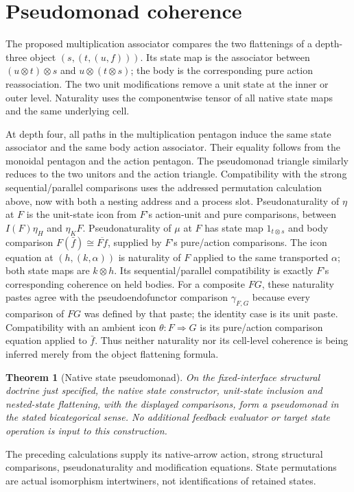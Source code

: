 \documentclass{article}
\newtheorem{theorem}{Theorem}
\begin{document}
\section{Pseudomonad coherence}
The proposed multiplication associator compares the two flattenings of a depth-three object $(s,(t,(u,f)))$. Its state map is the associator between $(u\otimes t)\otimes s$ and $u\otimes(t\otimes s)$; the body is the corresponding pure action reassociation. The two unit modifications remove a unit state at the inner or outer level. Naturality uses the componentwise tensor of all native state maps and the same underlying cell.

At depth four, all paths in the multiplication pentagon induce the same state associator and the same body action associator. Their equality follows from the monoidal pentagon and the action pentagon. The pseudomonad triangle similarly reduces to the two unitors and the action triangle. Compatibility with the strong sequential/parallel comparisons uses the addressed permutation calculation above, now with both a nesting address and a process slot. Pseudonaturality of $\eta$ at $F$ is the unit-state icon from $F$'s action-unit and pure comparisons, between $I(F)\eta_H$ and $\eta_KF$. Pseudonaturality of $\mu$ at $F$ has state map $1_{t\otimes s}$ and body comparison $F(\bar f)\cong\overline{Ff}$, supplied by $F$'s pure/action comparisons. The icon equation at $(h,(k,\alpha))$ is naturality of $F$ applied to the same transported $\alpha$; both state maps are $k\otimes h$. Its sequential/parallel compatibility is exactly $F$'s corresponding coherence on held bodies. For a composite $FG$, these naturality pastes agree with the pseudoendofunctor comparison $\gamma_{F,G}$ because every comparison of $FG$ was defined by that paste; the identity case is its unit paste. Compatibility with an ambient icon $\theta:F\Rightarrow G$ is its pure/action comparison equation applied to $\bar f$. Thus neither naturality nor its cell-level coherence is being inferred merely from the object flattening formula.

\begin{theorem}[Native state pseudomonad]
On the fixed-interface structural doctrine just specified, the native state constructor, unit-state inclusion and nested-state flattening, with the displayed comparisons, form a pseudomonad in the stated bicategorical sense. No additional feedback evaluator or target state operation is input to this construction.
\end{theorem}
The preceding calculations supply its native-arrow action, strong structural comparisons, pseudonaturality and modification equations. State permutations are actual isomorphism intertwiners, not identifications of retained states.
\end{document}
